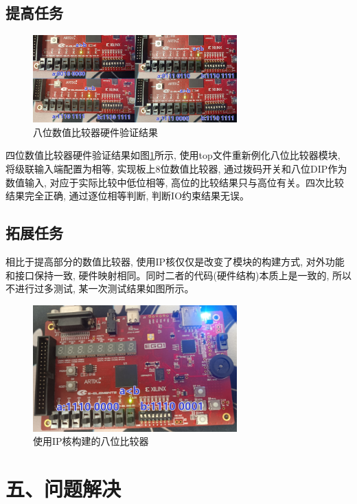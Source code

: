 \documentclass{article}
\newcommand{\fourhao}{\fontsize{14pt}{\baselineskip}\selectfont} %
\newcommand{\xiaosihao}{\fontsize{12pt}{\baselineskip}\selectfont} %
\begin{document}
\subsection*{提高任务}
\begin{figure}[htbp]
    \centering
    \includegraphics[width=0.7\textwidth]{image/2024-06-15-21-44-16.png}
    \caption{八位数值比较器硬件验证结果}
    \label{image_8bit_verify}
\end{figure}
四位数值比较器硬件验证结果如图\ref{image_8bit_verify}所示, 使用top文件重新例化八位比较器模块, 将级联输入端配置为相等, 实现板上8位数值比较器, 通过拨码开关和八位DIP作为数值输入,
对应于实际比较中低位相等, 高位的比较结果只与高位有关。四次比较结果完全正确, 通过逐位相等判断, 判断IO约束结果无误。
\subsection*{拓展任务}
相比于提高部分的数值比较器, 使用IP核仅仅是改变了模块的构建方式, 对外功能和接口保持一致, 硬件映射相同。同时二者的代码(硬件结构)本质上是一致的, 所以不进行过多测试, 某一次测试结果如图所示。
\begin{figure}[H]
    \centering
    \includegraphics[width=0.7\textwidth]{image/2024-06-15-22-30-05.png}
    \caption{使用IP核构建的八位比较器}
    \label{image_useIP_verify}
\end{figure}
\section*{\fourhao 五、问题解决}
\xiaosihao
{}
\end{document}
